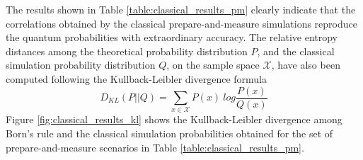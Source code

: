 The results shown in Table \ref{table:classical_results_pm} clearly indicate that the correlations obtained by the classical prepare-and-measure simulations reproduce the quantum probabilities with extraordinary accuracy. The relative entropy distances among the theoretical probability distribution $P$, and the classical simulation probability distribution $Q$, on the sample space $\mathcal{X}$, have also been computed following the Kullback-Leibler divergence formula \cite{mackay2003}
\begin{equation}\label{eq:kullback}
D_{KL}(P||Q) = \sum_{x\in \mathcal{X}}{P(x)\ log\frac{P(x)}{Q(x)}}
\end{equation}
Figure \ref{fig:classical_results_kl} shows the Kullback-Leibler divergence among Born's rule and the classical simulation probabilities obtained for the set of prepare-and-measure scenarios in Table \ref{table:classical_results_pm}.
\newline
